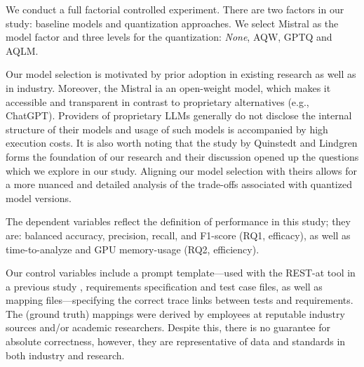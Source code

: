 We conduct a full factorial controlled experiment. There are two factors in our study: baseline models and quantization approaches. We select Mistral as the model factor and three levels for the quantization: \textit{None}, AQW, GPTQ and AQLM.


Our model selection is motivated by prior adoption in existing research as well as in industry. Moreover, the Mistral ia an open-weight model, which makes it accessible and transparent in contrast to proprietary alternatives (e.g., ChatGPT). Providers of proprietary LLMs generally do not disclose the internal structure of their models and usage of such models is accompanied by high execution costs. It is also worth noting that the study by Quinstedt and Lindgren \cite{quinstedt2024Optimizing} forms the foundation of our research and their discussion opened up the questions which we explore in our study. Aligning our model selection with theirs allows for a more nuanced and detailed analysis of the trade-offs associated with quantized model versions.

The dependent variables reflect the definition of performance in this study; they are: balanced accuracy, precision, recall, and F1-score (RQ1, efficacy), as well as time-to-analyze and GPU memory-usage (RQ2, efficiency).

Our control variables include a prompt template---used with the REST-at tool in a previous study \cite{quinstedt2024Optimizing}, requirements specification and test case files, as well as mapping files---specifying the correct trace links between tests and requirements. The (ground truth) mappings were derived by employees at reputable industry sources and/or academic researchers. Despite this, there is no guarantee for absolute correctness, however, they are representative of data and standards in both industry and research.


